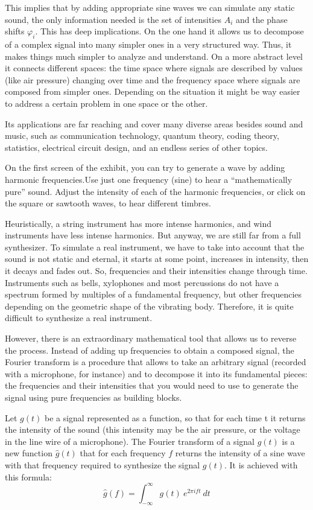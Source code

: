 This implies that by adding appropriate sine waves we can simulate any static sound, the only information needed is the set of intensities $A_i$ and the phase shifts $\varphi_i$. This has deep implications. On the one hand it allows us to decompose of a complex signal into many simpler ones in a very structured way. Thus, it makes things much simpler to analyze and understand. On a more abstract level it connects different spaces: the time space where signals are described by values (like air pressure) changing over time and the frequency space where signals are composed from simpler ones. Depending on the situation it might be way easier to address a certain problem in one space or the other.

Its applications are far reaching and cover many diverse areas besides sound and music, such as communication technology, quantum theory, coding theory, statistics, electrical circuit design, and an endless series of other topics.

On the first screen of the exhibit, you can try to generate a wave by adding harmonic frequencies.Use just one frequency (sine) to hear a ``mathematically pure'' sound. Adjust the intensity of each of the harmonic frequencies, or click on the square or sawtooth waves, to hear different timbres.


Heuristically, a string instrument has more intense harmonics, and wind instruments have less intense harmonics. But anyway, we are still far from a full synthesizer. To simulate a real instrument, we have to take into account that the sound is not static and eternal, it starts at some point, increases in intensity, then it decays and fades out. So, frequencies and their intensities change through time. Instruments such as bells, xylophones and most percussions do not have a spectrum formed by multiples of a fundamental frequency, but other frequencies depending on the geometric shape of the vibrating body. Therefore, it is quite difficult to synthesize a real instrument.

However, there is an extraordinary mathematical tool that allows us to reverse the process. Instead of adding up frequencies to obtain a composed signal, the Fourier transform is a procedure that allows to take an arbitrary signal (recorded with a microphone, for instance) and to decompose it into its fundamental pieces: the frequencies and their intensities that you would need to use to generate the signal using pure frequencies as building blocks.

Let $g(t)$ be a signal represented as a function, so that for each time t it returns the intensity of the sound (this intensity may be the air pressure, or the voltage in the line wire of a microphone). The Fourier transform of a signal $g(t)$ is a new function $\hat g(t)$ that for each frequency $f$ returns the intensity of a sine wave with that frequency required to synthesize the signal $g(t)$. It is achieved with this formula:
$$\hat g(f) = \int_{-\infty}^{\infty} g(t)\ e^{2\pi i f t } \ dt$$

